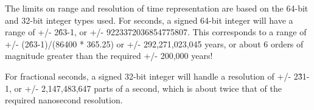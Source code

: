 
The limits on range and resolution of time representation are based on the
64-bit and 32-bit integer types used.  For seconds, a signed 64-bit integer
will have a range of +/- 2\^63-1, or +/- 9223372036854775807.  This corresponds
to a range of +/- (2\^63-1)/(86400 * 365.25) or +/- 292,271,023,045 years, or
about 6 orders of magnitude greater than the required +/- 200,000 years!

For fractional seconds, a signed 32-bit integer will handle a resolution of
+/- 2\^31-1, or +/- 2,147,483,647 parts of a second, which is about twice
that of the required nanosecond resolution.
